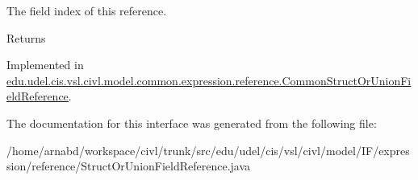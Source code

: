 The field index of this reference. 

\begin{DoxyReturn}{Returns}

\end{DoxyReturn}


Implemented in \hyperlink{classedu_1_1udel_1_1cis_1_1vsl_1_1civl_1_1model_1_1common_1_1expression_1_1reference_1_1CommonStructOrUnionFieldReference_aa5a40daf419de92aba8e24f31816103c}{edu.\+udel.\+cis.\+vsl.\+civl.\+model.\+common.\+expression.\+reference.\+Common\+Struct\+Or\+Union\+Field\+Reference}.



The documentation for this interface was generated from the following file\+:\begin{DoxyCompactItemize}
\item 
/home/arnabd/workspace/civl/trunk/src/edu/udel/cis/vsl/civl/model/\+I\+F/expression/reference/Struct\+Or\+Union\+Field\+Reference.\+java\end{DoxyCompactItemize}
